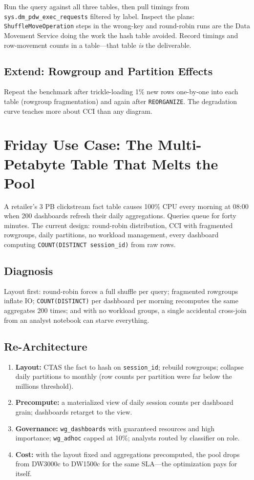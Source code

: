 Run the query against all three tables, then pull timings from \texttt{sys.dm\_pdw\_exec\_requests} filtered by label. Inspect the plans: \texttt{ShuffleMoveOperation} steps in the wrong-key and round-robin runs are the Data Movement Service doing the work the hash table avoided. Record timings and row-movement counts in a table---that table \emph{is} the deliverable.

\subsection{Extend: Rowgroup and Partition Effects}
Repeat the benchmark after trickle-loading 1\% new rows one-by-one into each table (rowgroup fragmentation) and again after \texttt{REORGANIZE}. The degradation curve teaches more about CCI than any diagram.

\section{Friday Use Case: The Multi-Petabyte Table That Melts the Pool}
A retailer's 3 PB clickstream fact table causes 100\% CPU every morning at 08:00 when 200 dashboards refresh their daily aggregations. Queries queue for forty minutes. The current design: round-robin distribution, CCI with fragmented rowgroups, daily partitions, no workload management, every dashboard computing \texttt{COUNT(DISTINCT session\_id)} from raw rows.

\subsection{Diagnosis}
Layout first: round-robin forces a full shuffle per query; fragmented rowgroups inflate IO; \texttt{COUNT(DISTINCT)} per dashboard per morning recomputes the same aggregates 200 times; and with no workload groups, a single accidental cross-join from an analyst notebook can starve everything.

\subsection{Re-Architecture}
\begin{enumerate}
    \item \textbf{Layout:} CTAS the fact to hash on \texttt{session\_id}; rebuild rowgroups; collapse daily partitions to monthly (row counts per partition were far below the millions threshold).
    \item \textbf{Precompute:} a materialized view of daily session counts per dashboard grain; dashboards retarget to the view.
    \item \textbf{Governance:} \texttt{wg\_dashboards} with guaranteed resources and high importance; \texttt{wg\_adhoc} capped at 10\%; analysts routed by classifier on role.
    \item \textbf{Cost:} with the layout fixed and aggregations precomputed, the pool drops from DW3000c to DW1500c for the same SLA---the optimization pays for itself.
\end{enumerate}

